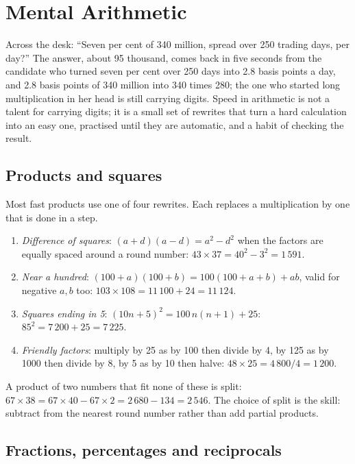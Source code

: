 \chapter{Mental Arithmetic}\label{ch:iv:mental-arithmetic}

Across the desk: ``Seven per cent of 340 million, spread over 250 trading days, per day?'' The answer, about
95 thousand, comes back in five seconds from the candidate who turned seven per cent over 250 days into 2.8
basis points a day, and 2.8 basis points of 340 million into 340 times 280; the one who started long
multiplication in her head is still carrying digits. Speed in arithmetic is not a talent for carrying digits;
it is a small set of rewrites that turn a hard calculation into an easy one, practised until they are
automatic, and a habit of checking the result.

\section{Products and squares}

Most fast products use one of four rewrites. Each replaces a multiplication by one that is done in a step.

\begin{method}\label{met:iv:mental-arithmetic:products}
\begin{enumerate}
\item \emph{Difference of squares}: $(a+d)(a-d) = a^2 - d^2$ when the factors are equally spaced around a round
number: $43 \times 37 = 40^2 - 3^2 = 1\,591$.
\item \emph{Near a hundred}: $(100+a)(100+b) = 100(100 + a + b) + ab$, valid for negative $a, b$ too: $103
\times 108 = 11\,100 + 24 = 11\,124$.
\item \emph{Squares ending in 5}: $(10n + 5)^2 = 100\,n(n+1) + 25$: $85^2 = 7\,200 + 25 = 7\,225$.
\item \emph{Friendly factors}: multiply by 25 as by 100 then divide by 4, by 125 as by 1000 then divide by 8,
by 5 as by 10 then halve: $48 \times 25 = 4\,800/4 = 1\,200$.
\end{enumerate}
\end{method}

A product of two numbers that fit none of these is split: $67 \times 38 = 67 \times 40 - 67 \times 2 = 2\,680 -
134 = 2\,546$. The choice of split is the skill: subtract from the nearest round number rather than add
partial products.

\section{Fractions, percentages and reciprocals}

